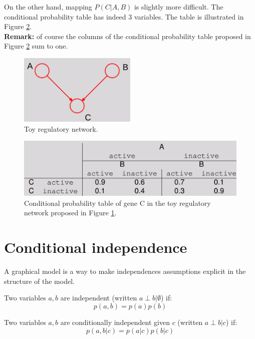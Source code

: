 On the other hand, mapping $P(C|A,B)$ is slightly more difficult. The
conditional probability table has indeed 3 variables. The table is illustrated in
Figure \ref{fig:geneBayesian_tableC}.\\ \textbf{Remark:} of course the columns
of the conditional probability table proposed in Figure
\ref{fig:geneBayesian_tableC} sum to one.

\begin{figure}[H]
	\centering
	\includegraphics[width=0.5\textwidth]{
		images/08_BayesianNetworks_exampleGene1.png
	}
	\caption{Toy regulatory network.}
	\label{fig:geneBayesian}
\end{figure}

\begin{figure}[H]
	\centering
	\includegraphics[width=\textwidth]{
		images/08_BayesianNetworks_exampleGene2.png
	}
	\caption{Conditional probability table of gene C in the toy regulatory network
	proposed in Figure \ref{fig:geneBayesian}.}
	\label{fig:geneBayesian_tableC}
\end{figure}

\section{Conditional independence}
A graphical model is a way to make independences assumptions explicit in the
structure of the model.
\newline

Two variables $a,b$ are independent (written $a \perp b | \emptyset$) if:
\begin{equation}
	p(a,b) = p(a)p(b)
\end{equation}

Two variables $a,b$ are conditionally independent given $c$ (written $a \perp b |
c$) if:
\begin{equation}
	\label{conditional_independence}p(a,b | c) = p(a|c) p(b|c)
\end{equation}

